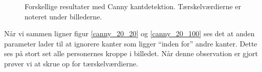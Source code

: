 {\begin{figure}[!h]
    \caption[]{Forskellige resultater med Canny kantdetektion.
    Tærskelværdierne er noteret under billederne.}
    \label{simple_metode}
\end{figure}

Når vi sammen ligner figur \ref{canny_20_20} og \ref{canny_20_100} ses
det at anden parameter lader til at ignorere kanter som ligger
``inden for'' andre kanter. Dette ses på stort set alle personernes
kroppe i billedet. Når denne observation er gjort prøver vi at skrue op
for tærskelværdierne.
}

